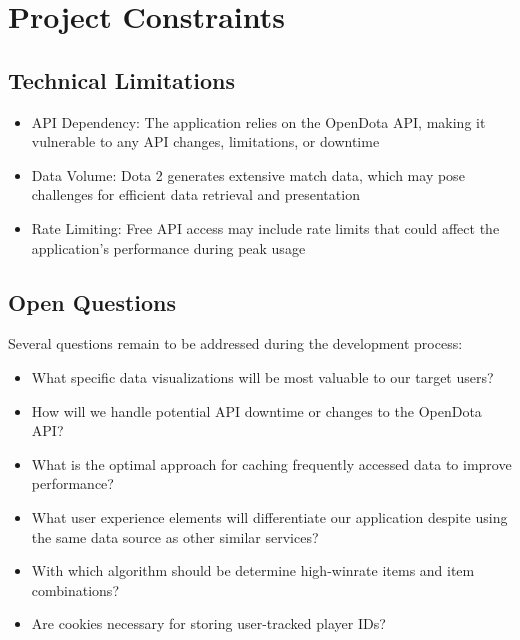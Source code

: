 \section{Project Constraints}
\subsection{Technical Limitations}
\begin{itemize}
    \item API Dependency: The application relies on the OpenDota API, making it vulnerable to any API changes, limitations, or downtime
    \item Data Volume: Dota 2 generates extensive match data, which may pose challenges for efficient data retrieval and presentation
    \item Rate Limiting: Free API access may include rate limits that could affect the application's performance during peak usage
\end{itemize}

\subsection{Open Questions}
Several questions remain to be addressed during the development process:
\begin{itemize}
    \item What specific data visualizations will be most valuable to our target users?
    \item How will we handle potential API downtime or changes to the OpenDota API?
    \item What is the optimal approach for caching frequently accessed data to improve performance?
    \item What user experience elements will differentiate our application despite using the same data source as other similar services?
    \item With which algorithm should be determine high-winrate items and item combinations?
    \item Are cookies necessary for storing user-tracked player IDs?
\end{itemize}